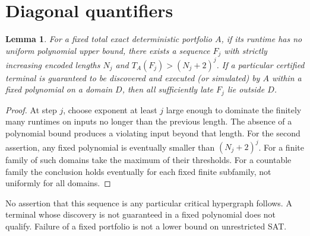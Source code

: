 \documentclass[11pt]{article}
\newtheorem{lemma}[theorem]{Lemma}
\begin{document}
\section{Diagonal quantifiers}\label{sec:diagonal}
\begin{lemma}\label{lem:diagonal}
For a fixed total exact deterministic portfolio $A$, if its runtime has no uniform polynomial upper bound, there exists a sequence $F_j$ with strictly increasing encoded lengths $N_j$ and $T_A(F_j)>(N_j+2)^j$. If a particular certified terminal is guaranteed to be discovered and executed (or simulated) by $A$ within a fixed polynomial on a domain $D$, then all sufficiently late $F_j$ lie outside $D$.
\end{lemma}
\begin{proof}
At step $j$, choose exponent at least $j$ large enough to dominate the finitely many runtimes on inputs no longer than the previous length. The absence of a polynomial bound produces a violating input beyond that length. For the second assertion, any fixed polynomial is eventually smaller than $(N_j+2)^j$. For a finite family of such domains take the maximum of their thresholds. For a countable family the conclusion holds eventually for each fixed finite subfamily, not uniformly for all domains.
\end{proof}
No assertion that this sequence is any particular critical hypergraph follows. A terminal whose discovery is not guaranteed in a fixed polynomial does not qualify. Failure of a fixed portfolio is not a lower bound on unrestricted SAT.
\end{document}
